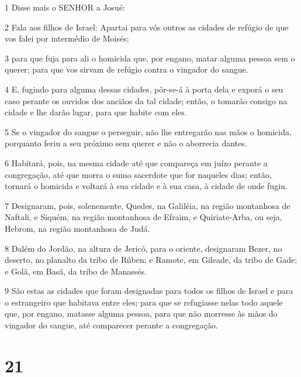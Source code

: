 \par 1 Disse mais o SENHOR a Josué:
\par 2 Fala aos filhos de Israel: Apartai para vós outros as cidades de refúgio de que vos falei por intermédio de Moisés;
\par 3 para que fuja para ali o homicida que, por engano, matar alguma pessoa sem o querer; para que vos sirvam de refúgio contra o vingador do sangue.
\par 4 E, fugindo para alguma dessas cidades, pôr-se-á à porta dela e exporá o seu caso perante os ouvidos dos anciãos da tal cidade; então, o tomarão consigo na cidade e lhe darão lugar, para que habite com eles.
\par 5 Se o vingador do sangue o perseguir, não lhe entregarão nas mãos o homicida, porquanto feriu a seu próximo sem querer e não o aborrecia dantes.
\par 6 Habitará, pois, na mesma cidade até que compareça em juízo perante a congregação, até que morra o sumo sacerdote que for naqueles dias; então, tornará o homicida e voltará à sua cidade e à sua casa, à cidade de onde fugiu.
\par 7 Designaram, pois, solenemente, Quedes, na Galiléia, na região montanhosa de Naftali, e Siquém, na região montanhosa de Efraim, e Quiriate-Arba, ou seja, Hebrom, na região montanhosa de Judá.
\par 8 Dalém do Jordão, na altura de Jericó, para o oriente, designaram Bezer, no deserto, no planalto da tribo de Rúben; e Ramote, em Gileade, da tribo de Gade; e Golã, em Basã, da tribo de Manassés.
\par 9 São estas as cidades que foram designadas para todos os filhos de Israel e para o estrangeiro que habitava entre eles; para que se refugiasse nelas todo aquele que, por engano, matasse alguma pessoa, para que não morresse às mãos do vingador do sangue, até comparecer perante a congregação.

\chapter{21}

